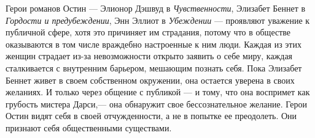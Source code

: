 \documentclass[12pt]{book}
\begin{document}
Герои романов Остин --- Элионор Дэшвуд в \textit{Чувственности}, Элизабет Беннет в \textit{Гордости и предубеждении}, Энн Эллиот в \textit{Убеждении} --- проявляют уважение к публичной сфере, хотя это причиняет им страдания, потому что в обществе оказываются в том числе враждебно настроенные к ним люди. Каждая из этих женщин страдает из-за невозможности открыто заявить о себе миру, каждая сталкивается с внутренним барьером, мешающим познать себя. Пока Элизабет Беннет живет в своем собственном окружении, она остается уверена в своих желаниях. И только через общение с публикой --- и тому, что она воспримет как грубость мистера Дарси,--- она обнаружит свое бессознательное желание. Герои Остин видят себя в своей отчужденности, а не в попытке ее преодолеть. Они признают себя общественными существами.
\end{document}
